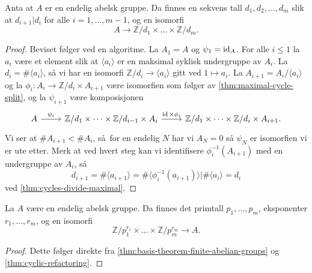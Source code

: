 \begin{theorem}
    \label{thm:basis-theorem-finite-abelian-groups}
    Anta at $A$ er en endelig abelsk gruppe.
    Da finnes en sekvens tall $d_1,d_2,\dots, d_m$ slik at
    $d_{i + 1} | d_i$ for alle $i = 1,\dots, m - 1$,
    og en isomorfi
    \[
        A
        \to \mathbb Z / d_1\times\dots\times \mathbb Z / d_m.
    \]
\end{theorem}
\begin{proof}
    Beviset følger ved en algoritme.
    La $A_1 = A$ og $\psi_1 = \operatorname{id}_A$.
    For alle $i\leq 1$ la $a_i$ være et element
    slik at $\langle a_i\rangle$ er en maksimal syklisk undergruppe av $A_i$.
    La $d_i = \#\langle a_i\rangle$, så vi har en isomorfi
    $\mathbb Z / d_i\to \langle a_i\rangle$ gitt ved $1\mapsto a_i$.
    La $A_{i + 1} = A_i / \langle a_i\rangle$
    og la $\phi_i\colon A_i\to \mathbb Z / d_i\times A_{i + 1}$ være isomorfien
    som følger av \cref{thm:maximal-cycle-split},
    og la $\psi_{i + 1}$ være komposisjonen
    \[\begin{tikzcd}
        A
        \rar{\psi_i}
        &
        \mathbb Z / d_1\times\dots\times \mathbb Z / d_{i - 1}\times A_i
        \rar{\id\times \phi_i}
        &
        \mathbb Z / d_1\times \dots \times \mathbb Z / d_i \times A_{i + 1}.
    \end{tikzcd}\]
    Vi ser at $\# A_{i + 1} < \# A_i$,
    så for en endelig $N$ har vi $A_N = 0$ så $\psi_N$ er isomorfien vi er ute etter.
    Merk at ved hvert steg kan vi identifisere $\phi_i^{-1}(A_{i + 1})$
    med en undergruppe av $A_i$,
    så
    \[
        d_{i + 1}
        = \#\langle a_{i + 1}\rangle
        = \#\langle \phi_i^{-1}(a_{i + 1})\rangle
        | \#\langle a_i\rangle
        = d_i
    \]
    ved \cref{thm:cycles-divide-maximal}.
\end{proof}

\begin{corollary}
    La $A$ være en endelig abelsk gruppe.
    Da finnes det primtall $p_1,\dots, p_m$,
    eksponenter $r_1,\dots,r_m$,
    og en isomorfi
    \[
        \mathbb Z / p_1^{r_1} \times \dots \times\mathbb Z / p_m^{r_m}
        \to A.
    \]
\end{corollary}
\begin{proof}
    Dette følger direkte fra \cref{thm:basis-theorem-finite-abelian-groups}
    og \cref{thm:cyclic-refactoring}.
\end{proof}

